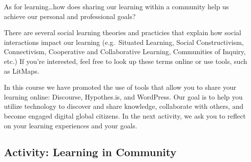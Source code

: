 \documentclass[
]{book}
\theoremstyle{definition}
\theoremstyle{definition}
\theoremstyle{definition}
\theoremstyle{definition}
\theoremstyle{remark}
\begin{document}
As for learning\ldots how does sharing our learning within a community help us achieve our personal and professional goals?

There are several social learning theories and practicies that explain how social interactions impact our learning (e.g.~Situated Learning, Social Constructivism, Connectivism, Cooperative and Collaborative Learning, Communities of Inquiry, etc.) If you're interested, feel free to look up these terms online or use tools, such as LitMaps.

In this course we have promoted the use of tools that allow you to share your learning online: Discourse, Hypothes.is, and WordPress. Our goal is to help you utilize technology to discover and share knowledge, collaborate with others, and become engaged digital global citizens. In the next activity, we ask you to reflect on your learning experiences and your goals.

\hypertarget{activity-learning-in-community}{%
\subsection*{Activity: Learning in Community}\label{activity-learning-in-community}}
\end{document}
